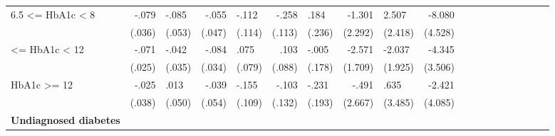 \begin{table}[h]
\begin{center}
{{\begin{tabular}{l*{9}{D{.}{.}{-1}l}}
6.5 <= HbA1c < 8&    -.079\sym{**} &    -.085         &    -.055         &    -.112         &    -.258\sym{**} &     .184         &   -1.301         &    2.507         &   -8.080\sym{*}  \\                 &   (.036)         &   (.053)         &   (.047)         &   (.114)         &   (.113)         &   (.236)         &  (2.292)         &  (2.418)         &  (4.528)         \\  <= HbA1c < 12 &    -.071\sym{***}&    -.042         &    -.084\sym{**} &     .075         &     .103         &    -.005         &   -2.571         &   -2.037         &   -4.345         \\                 &   (.025)         &   (.035)         &   (.034)         &   (.079)         &   (.088)         &   (.178)         &  (1.709)         &  (1.925)         &  (3.506)         \\ \addlinespace HbA1c >= 12     &    -.025         &     .013         &    -.039         &    -.155         &    -.103         &    -.231         &    -.491         &     .635         &   -2.421         \\                 &   (.038)         &   (.050)         &   (.054)         &   (.109)         &   (.132)         &   (.193)         &  (2.667)         &  (3.485)         &  (4.085)         \\ \addlinespace 
\textbf{Undiagnosed diabetes} &&&&&&&& \\

\end{tabular}}}
\end{center}
\end{table}
